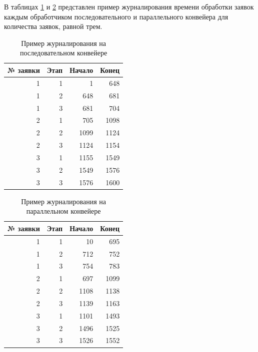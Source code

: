 В таблицах \ref{table:journal1} и \ref{table:journal2} представлен пример журналирования времени обработки заявок каждым обработчиком последовательного и параллельного конвейера для количества заявок, равной трем.

\begin{table}[h]
  \caption{\label{table:journal1} Пример журналирования на последовательном конвейере}
  \begin{center}
    \begin{tabular}{|r|r|r|r|}
      \hline
  № заявки &       Этап &     Начало &      Конец \\ \hline
         1 &          1 &          1 &        648 \\ \hline
         1 &          2 &        648 &        681 \\ \hline
         1 &          3 &        681 &        704 \\ \hline
         2 &          1 &        705 &       1098 \\ \hline
         2 &          2 &       1099 &       1124 \\ \hline
         2 &          3 &       1124 &       1154 \\ \hline
         3 &          1 &       1155 &       1549 \\ \hline
         3 &          2 &       1549 &       1576 \\ \hline
         3 &          3 &       1576 &       1600 \\ \hline
    \end{tabular}
  \end{center}
\end{table}

\begin{table}[h]
  \caption{\label{table:journal2} Пример журналирования на параллельном конвейере}
  \begin{center}
    \begin{tabular}{|r|r|r|r|}
      \hline
  № заявки &       Этап &     Начало &      Конец \\ \hline
         1 &          1 &         10 &        695 \\ \hline
         1 &          2 &        712 &        752 \\ \hline
         1 &          3 &        754 &        783 \\ \hline
         2 &          1 &        697 &       1099 \\ \hline
         2 &          2 &       1108 &       1138 \\ \hline
         2 &          3 &       1139 &       1163 \\ \hline
         3 &          1 &       1101 &       1493 \\ \hline
         3 &          2 &       1496 &       1525 \\ \hline
         3 &          3 &       1526 &       1552 \\ \hline
    \end{tabular}
  \end{center}
\end{table}

